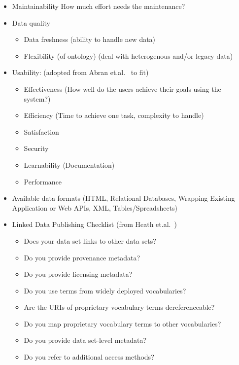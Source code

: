 \begin{itemize}
\item Maintainability
How much effort needs the maintenance? 

\item Data quality 
\begin{itemize}
\item Data freshness (ability to handle new data)
\item Flexibility (of ontology) (deal with heterogenous and/or legacy data)
\end{itemize}

\item Usability: (adopted from Abran et.al.~\cite{abran2003usability} to fit)
\begin{itemize}
\item Effectiveness (How well do the users achieve their goals using the system?)
\item Efficiency (Time to achieve one task, complexity to handle)
\item Satisfaction
\item Security
\item Learnability (Documentation)
\item Performance
\end{itemize}

\item Available data formats (HTML, Relational Databases, Wrapping Existing Application or Web APIs, XML, Tables/Spreadsheets)

\item Linked Data Publishing Checklist (from Heath et.al.~\cite{heath2011linked})
\begin{itemize}
\item Does your data set links to other data sets?
\item Do you provide provenance metadata?
\item Do you provide licensing metadata?
\item Do you use terms from widely deployed vocabularies?
\item Are the URIs of proprietary vocabulary terms dereferenceable?
\item Do you map proprietary vocabulary terms to other vocabularies?
\item Do you provide data set-level metadata?
\item Do you refer to additional access methods?
\end{itemize}
\end{itemize}